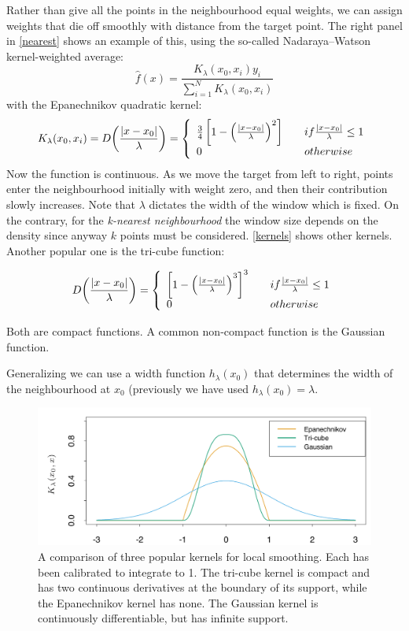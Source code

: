 Rather than give all the points in the neighbourhood equal weights, we can assign weights that die off smoothly with distance from the target point. The right panel in \autoref{nearest} shows an example of this, using the so-called Nadaraya–Watson kernel-weighted average:
\begin{equation}
\hat{f}(x) = \frac{K_\lambda(x_0, x_i)y_i}{\sum_{i=1}^N K_\lambda(x_0, x_i)}
\end{equation}
with the Epanechnikov quadratic kernel:
\begin{equation}
K_\lambda(x_0, x_i)= D\br{\frac{|x-x_0|}{\lambda}} = \left\{ \begin{array}{ll}  \frac{3}{4}\left[1-\left(\frac{|x-x_0|}{\lambda} \right)^2 \right]&\quad if \frac{|x-x_0|}{\lambda}\le 1\\
0 &\quad otherwise
\end{array}
 \right.
\end{equation}
Now the function is continuous. As we move the target from left to right, points enter the neighbourhood initially with weight zero, and then their contribution slowly increases. Note that $\lambda$ dictates the width of the window which is fixed. On the contrary, for the \textit{k-nearest neighbourhood} the window size depends on the density since anyway $k$ points must be considered. \autoref{kernels} shows other kernels. Another popular one is the tri-cube function:

\begin{equation}
 D\br{\frac{|x-x_0|}{\lambda}} = \left\{ \begin{array}{ll}  \left[1-\left(\frac{|x-x_0|}{\lambda} \right)^3 \right]^3&\quad if \frac{|x-x_0|}{\lambda}\le 1\\
0 &\quad otherwise
\end{array}
 \right.
\end{equation}

Both are compact functions. A common non-compact function is the Gaussian function.

Generalizing we can use a width function $h_\lambda(x_0)$ that determines the width of the neighbourhood at $x_0$ (previously we have used $h_\lambda(x_0) = \lambda$.

\begin{figure}
\centering
\includegraphics[scale=0.4]{img/kernels}
\caption{A comparison of three popular kernels for local smoothing. Each has been calibrated to integrate to 1. The tri-cube kernel is compact and has two continuous derivatives at the boundary of its support, while the Epanechnikov kernel has none. The Gaussian kernel is continuously differentiable, but has infinite support.}
\label{kernels}
\end{figure}

